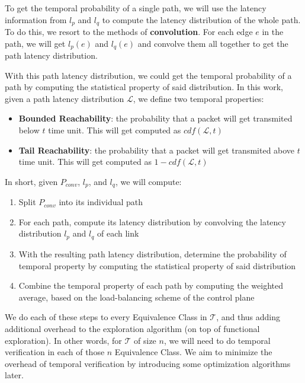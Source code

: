 \documentclass[10pt,sigconf,letterpaper,anonymous,nonacm]{acmart}
\begin{document}
To get the temporal probability of a single path, we will use the latency information 
from $l_p$ and $l_q$ to compute the latency distribution of the whole path.
To do this, we resort to the methods of \textbf{convolution}.
For each edge $e$ in the path, we will get $l_p(e)$ and $l_q(e)$ and convolve them 
all together to get the path latency distribution.

With this path latency distribution, we could get the temporal probability of a 
path by computing the statistical property of said distribution.
In this work, given a path latency distribution $\mathcal{L}$, we define two temporal 
properties:
\begin{itemize}
    \item \textbf{Bounded Reachability}: the probability that a packet will get 
        transmited below $t$ time unit. This will get computed as $cdf(\mathcal{L}, t)$
    \item \textbf{Tail Reachability}: the probability that a packet will get 
        transmited above $t$ time unit. This will get computed as 
        $1 - cdf(\mathcal{L}, t)$
\end{itemize}

In short, given $P_{conv}$, $l_p$, and $l_q$, we will compute:
\begin{enumerate}
    \item Split $P_{conv}$ into its individual path
    \item For each path, compute its latency distribution by convolving the latency distribution 
        $l_p$ and $l_q$ of each link
    \item With the resulting path latency distribution, determine the probability of temporal 
        property by computing the statistical property of said distribution
    \item Combine the temporal property of each path by computing the weighted average, based 
        on the load-balancing scheme of the control plane
\end{enumerate}

We do each of these steps to every Equivalence Class in $\mathcal{T}$, and thus adding additional 
overhead to the exploration algorithm (on top of functional exploration).
In other words, for $\mathcal{T}$ of size $n$, we will need to do temporal verification in each of 
those $n$ Equivalence Class.
We aim to minimize the overhead of temporal verification by introducing some optimization algorithms
later.

\end{document}
